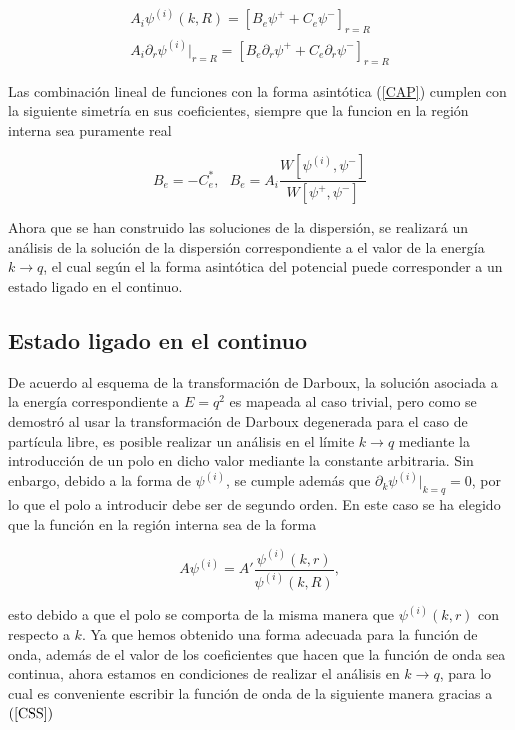 \begin{eqnarray*}
A_i \psi^{(i)}(k,R) = [B_e \psi^{+} + C_e \psi^{-}]_{r=R}\\
A_i \partial_r \psi^{(i)}|_{r=R}= [B_e \partial_r \psi^{+} + C_e \partial_r \psi^{-}]_{r=R}
\end{eqnarray*} 

Las combinación lineal de funciones con la forma asintótica (\ref{CAP}) cumplen con la siguiente simetría en sus coeficientes, siempre que la funcion en la región interna sea puramente real

\begin{equation}
B_e = -C_e^{*},\,\,\,\, B_e = A_i \frac{W[\psi^{(i)},\psi^{-}]}{W[\psi^{+},\psi^{-}]} \label{CSS}
\end{equation}

Ahora que se han construido las soluciones de la dispersión, se realizará un análisis de la solución de la dispersión correspondiente a el valor de la energía $k \to q$, el cual según el la forma asintótica del potencial puede corresponder a un estado ligado en el continuo.

\subsection{Estado ligado en el continuo}

De acuerdo al esquema de la transformación de Darboux, la solución asociada a la energía correspondiente a $E=q^2$ es mapeada al caso trivial, pero como se demostró al usar la transformación de Darboux degenerada para el caso de partícula libre, es posible realizar un análisis en el límite $k \to q$ mediante la introducción de un polo en dicho valor mediante la constante arbitraria. Sin enbargo, debido a la forma de $\psi^{(i)}$, se cumple además que $\partial_k \psi^{(i)}|_{k=q}=0$, por lo que el polo a introducir debe ser de segundo orden. En este caso se ha elegido que la función en la región interna sea de la forma

\begin{equation*}
A \psi^{(i)} = A' \frac{\psi^{(i)}(k,r)}{\psi^{(i)}(k,R)},
\end{equation*}

esto debido a que el polo se comporta de la misma manera que $\psi^{(i)}(k,r)$ con respecto a $k$. Ya que hemos obtenido una forma adecuada para la función de onda, además de el valor de los coeficientes que hacen que la función de onda sea continua, ahora estamos en condiciones de realizar el análisis en $k \to q$, para lo cual es conveniente escribir la función de onda de la siguiente manera gracias a $(\ref{CSS})$


